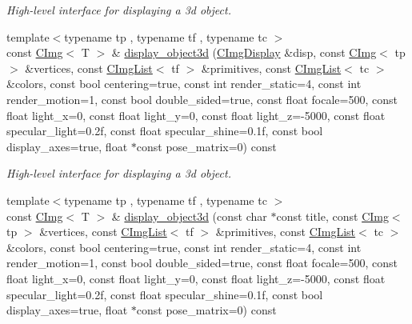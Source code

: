 \begin{DoxyCompactItemize}
\begin{DoxyCompactList}\small\item\em High-\/level interface for displaying a 3d object. \item\end{DoxyCompactList}\item 
\hypertarget{structcimg__library_1_1CImg_aa4d9e99c5bfdb777045c7bca0721a2d3}{
{\footnotesize template$<$typename tp , typename tf , typename tc $>$ }\\const \hyperlink{structcimg__library_1_1CImg}{CImg}$<$ T $>$ \& \hyperlink{structcimg__library_1_1CImg_aa4d9e99c5bfdb777045c7bca0721a2d3}{display\_\-object3d} (\hyperlink{structcimg__library_1_1CImgDisplay}{CImgDisplay} \&disp, const \hyperlink{structcimg__library_1_1CImg}{CImg}$<$ tp $>$ \&vertices, const \hyperlink{structcimg__library_1_1CImgList}{CImgList}$<$ tf $>$ \&primitives, const \hyperlink{structcimg__library_1_1CImgList}{CImgList}$<$ tc $>$ \&colors, const bool centering=true, const int render\_\-static=4, const int render\_\-motion=1, const bool double\_\-sided=true, const float focale=500, const float light\_\-x=0, const float light\_\-y=0, const float light\_\-z=-\/5000, const float specular\_\-light=0.2f, const float specular\_\-shine=0.1f, const bool display\_\-axes=true, float $\ast$const pose\_\-matrix=0) const }
\label{structcimg__library_1_1CImg_aa4d9e99c5bfdb777045c7bca0721a2d3}

\begin{DoxyCompactList}\small\item\em High-\/level interface for displaying a 3d object. \item\end{DoxyCompactList}\item 
\hypertarget{structcimg__library_1_1CImg_a058bbe51a428eeb9dc778282c180ddbe}{
{\footnotesize template$<$typename tp , typename tf , typename tc $>$ }\\const \hyperlink{structcimg__library_1_1CImg}{CImg}$<$ T $>$ \& \hyperlink{structcimg__library_1_1CImg_a058bbe51a428eeb9dc778282c180ddbe}{display\_\-object3d} (const char $\ast$const title, const \hyperlink{structcimg__library_1_1CImg}{CImg}$<$ tp $>$ \&vertices, const \hyperlink{structcimg__library_1_1CImgList}{CImgList}$<$ tf $>$ \&primitives, const \hyperlink{structcimg__library_1_1CImgList}{CImgList}$<$ tc $>$ \&colors, const bool centering=true, const int render\_\-static=4, const int render\_\-motion=1, const bool double\_\-sided=true, const float focale=500, const float light\_\-x=0, const float light\_\-y=0, const float light\_\-z=-\/5000, const float specular\_\-light=0.2f, const float specular\_\-shine=0.1f, const bool display\_\-axes=true, float $\ast$const pose\_\-matrix=0) const }
\label{structcimg__library_1_1CImg_a058bbe51a428eeb9dc778282c180ddbe}


\end{DoxyCompactItemize}

